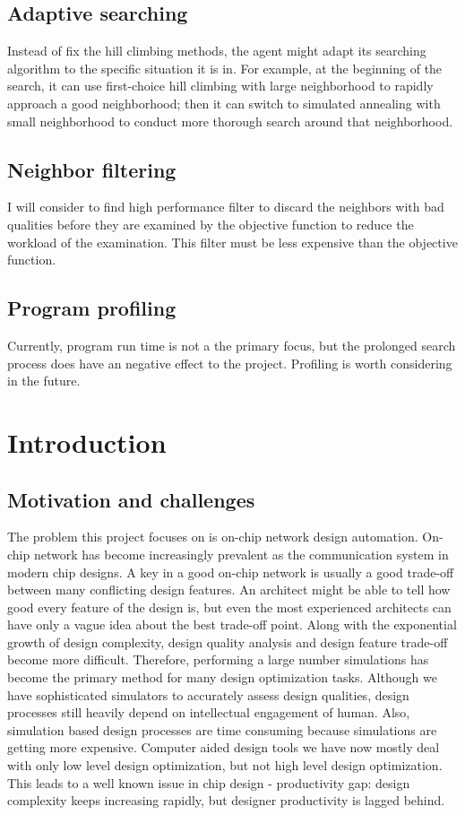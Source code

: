 \documentclass[12pt]{article}
\theoremstyle{definition}
\begin{document}
\subsection{Adaptive searching}
Instead of fix the hill climbing methods, the agent might adapt its searching algorithm to the specific situation it is in. For example, at the beginning of the search, it can use first-choice hill climbing with large neighborhood to rapidly approach a good neighborhood; then it can switch to simulated annealing with small neighborhood to conduct more thorough search around that neighborhood.
\subsection{Neighbor filtering}
I will consider to find high performance filter to discard the neighbors with bad qualities before they are examined by the objective function to reduce the workload of the examination. This filter must be less expensive than the objective function.
\subsection{Program profiling}
Currently, program run time is not a the primary focus, but the prolonged search process does have an negative effect to the project. Profiling is worth considering in the future.

\section{Introduction}
\subsection{Motivation and challenges}
The problem this project focuses on is on-chip network design automation. On-chip network has become increasingly prevalent as the communication system in modern chip designs. A key in a good on-chip network is usually a good trade-off between many conflicting design features. An architect might be able to tell how good every feature of the design is, but even the most experienced architects can have only a vague idea about the best trade-off point. Along with the exponential growth of design complexity, design quality analysis and design feature trade-off become more difficult. Therefore, performing a large number simulations has become the primary method for many design optimization tasks. Although we have sophisticated simulators \cite{amoretti2014modeling} \cite{jiang2013detailed} to accurately assess design qualities, design processes still heavily depend on intellectual engagement of human. Also, simulation based design processes are time consuming because simulations are getting more expensive. Computer aided design tools we have now mostly deal with only low level design optimization, but not high level design optimization. This leads to a well known issue in chip design - productivity gap: design complexity keeps increasing rapidly, but designer productivity is lagged behind.
\end{document}
